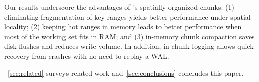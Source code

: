 Our results underscore the advantages of \sys's spatially-organized chunks:
(1) eliminating fragmentation of key ranges  yields better  performance under spatial locality; 
(2) keeping hot ranges in memory leads to better performance when most of the working set fits in RAM; and 
(3) in-memory chunk compaction saves disk flushes and reduces write volume.  
In addition, in-chunk logging allows quick recovery from crashes with no need to replay a WAL.


~\cref{sec:related}  surveys related work and~\cref{sec:conclusions} concludes this paper. 
